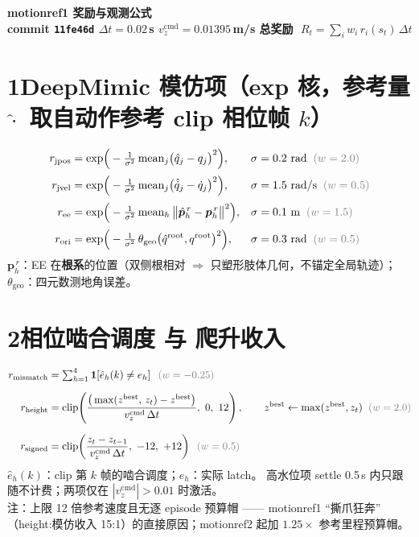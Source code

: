 \documentclass[12pt]{article}
\newcommand{\w}[1]{\;\;{\color{gray}(w=#1)}}
\begin{document}
\begin{center}\Large\bfseries motionref1 奖励与观测公式 \\
\normalsize\mdseries commit \texttt{11fe46d} \quad $\Delta t=0.02$\,s \quad
$v_z^{\mathrm{cmd}}=0.01395$\,m/s \quad
总奖励 $\;R_t=\sum_i w_i\, r_i(s_t)\,\Delta t$
\end{center}

\section*{1\quad DeepMimic 模仿项（exp 核，参考量 $\hat\cdot$ 取自动作参考 clip 相位帧 $k$）}
\begin{align*}
r_{\mathrm{jpos}} &= \exp\!\Big(-\tfrac{1}{\sigma^2}\,\mathrm{mean}_j\big(\hat q_j - q_j\big)^2\Big),
  & \sigma &= 0.2\ \mathrm{rad} \w{2.0}\\[2pt]
r_{\mathrm{jvel}} &= \exp\!\Big(-\tfrac{1}{\sigma^2}\,\mathrm{mean}_j\big(\hat{\dot q}_j - \dot q_j\big)^2\Big),
  & \sigma &= 1.5\ \mathrm{rad/s} \w{0.5}\\[2pt]
r_{\mathrm{ee}} &= \exp\!\Big(-\tfrac{1}{\sigma^2}\,\mathrm{mean}_h\,
  \big\lVert \hat{\bm p}^{\,r}_h - \bm p^{\,r}_h \big\rVert^2\Big),
  & \sigma &= 0.1\ \mathrm{m} \w{1.5}\\[2pt]
r_{\mathrm{ori}} &= \exp\!\Big(-\tfrac{1}{\sigma^2}\,
  \theta_{\mathrm{geo}}\big(\hat q^{\mathrm{root}}, q^{\mathrm{root}}\big)^2\Big),
  & \sigma &= 0.3\ \mathrm{rad} \w{0.5}
\end{align*}
$\bm p^{\,r}_h$：EE 在\textbf{根系}的位置（双侧根相对 $\Rightarrow$ 只塑形肢体几何，不锚定全局轨迹）；
$\theta_{\mathrm{geo}}$：四元数测地角误差。

\newpage
\section*{2\quad 相位啮合调度 与 爬升收入}
\begin{align*}
r_{\mathrm{mismatch}} &= \textstyle\sum_{h=1}^{4} \mathbf{1}\!\left[\hat e_h(k) \ne e_h\right]
  \w{-0.25}\\[6pt]
r_{\mathrm{height}} &= \mathrm{clip}\!\left(
  \frac{\big(\max(z^{\mathrm{best}},\,z_t) - z^{\mathrm{best}}\big)}
       {v_z^{\mathrm{cmd}}\,\Delta t},\ 0,\ 12\right),
  \qquad z^{\mathrm{best}} \leftarrow \max(z^{\mathrm{best}}, z_t) \w{2.0}\\[6pt]
r_{\mathrm{signed}} &= \mathrm{clip}\!\left(
  \frac{z_t - z_{t-1}}{v_z^{\mathrm{cmd}}\,\Delta t},\ -12,\ +12\right) \w{0.5}
\end{align*}
$\hat e_h(k)$：clip 第 $k$ 帧的啮合调度；$e_h$：实际 latch。
高水位项 settle 0.5\,s 内只跟随不计费；两项仅在 $|v_z^{\mathrm{cmd}}|>0.01$ 时激活。\\[4pt]
{\color{red}注：上限 12 倍参考速度且无逐 episode 预算帽 —— motionref1 ``撕爪狂奔''
（height:模仿收入 15:1）的直接原因；motionref2 起加 $1.25\times$ 参考里程预算帽。}
\end{document}
